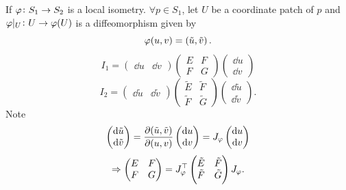\begin{remark}
    If \(\varphi\colon S_1\to S_2\) is a local isometry.
    \(\forall p\in S_1\), let \(U\) be a coordinate patch of 
    \(p\) and \(\varphi|_U\colon U\to \varphi(U)\) is a diffeomorphism 
    given by 
    \[
        \varphi(u,v)=\left(\tilde{u},\tilde{v}\right).    
    \]
    \[
        I_1=\begin{pmatrix}
            \dd u& \dd v
        \end{pmatrix}
        \begin{pmatrix}
            E&F\\
            F&G
        \end{pmatrix}
        \begin{pmatrix}
            \dd u\\
            \dd v
        \end{pmatrix}
    \]
    \[
        I_2=\begin{pmatrix}
            \dd \tilde{u}& \dd \tilde{v}
        \end{pmatrix}
        \begin{pmatrix}
            \tilde{E}&\tilde{F}\\
            \tilde{F}&\tilde{G}
        \end{pmatrix}
        \begin{pmatrix}
            \dd \tilde{u}\\
            \dd \tilde{v}
        \end{pmatrix}.
    \]
    Note 
    \[
        \begin{pmatrix}
            \dd \tilde{u}\\
            \dd \tilde{v}
        \end{pmatrix}
        =
        \pdv{(\tilde{u},\tilde{v})}{(u,v)}
        \begin{pmatrix}
            \dd u\\
            \dd v
        \end{pmatrix}
        =
        J_\varphi 
        \begin{pmatrix}
            \dd u\\
            \dd v
        \end{pmatrix}    
    \]
    \[
        \Rightarrow 
        \begin{pmatrix}
            E&F\\
            F&G
        \end{pmatrix}=
        J_\varphi^\top \begin{pmatrix}
            \tilde{E}&\tilde{F}\\
            \tilde{F}&\tilde{G}
        \end{pmatrix} J_\varphi. 
    \]
\end{remark}
